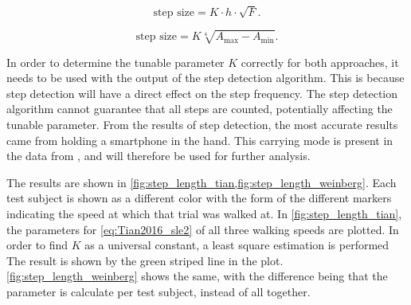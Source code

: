 \begin{equation}
\label{eq:Tian2016_sle2}
\text{step size} = K \cdot h \cdot \sqrt{F}.
\end{equation}

\begin{equation}
	\text{step size} =K \sqrt[4]{A_{\max }-A_{\min }}.
	\label{eq:weinberg_stepsize2}
\end{equation}

In order to determine the tunable parameter $K$ correctly for both approaches, it needs to be used with the output of the step detection algorithm. This is because step detection will have a direct effect on the step frequency. The step detection algorithm cannot guarantee that all steps are counted, potentially affecting the tunable parameter. 
From the results of step detection, the most accurate results came from holding a smartphone in the hand. This carrying mode is present in the data from \cite{Vezocnik2019}, and will therefore be used for further analysis. \par

The results are shown in \cref{fig:step_length_tian,fig:step_length_weinberg}. Each test subject is shown as a different color with the form of the different markers indicating the speed at which that trial was walked at. In \cref{fig:step_length_tian}, the parameters for \eqref{eq:Tian2016_sle2} of all three walking speeds are plotted. In order to find $K$ as a universal constant, a least square estimation is performed The result is shown by the green striped line in the plot. \cref{fig:step_length_weinberg} shows the same, with the difference being that the parameter is calculate per test subject, instead of all together. 

